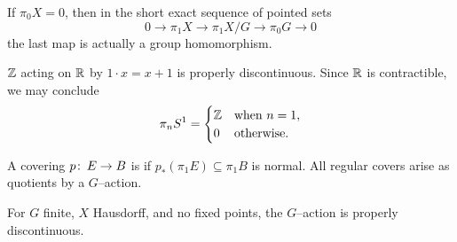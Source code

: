 \begin{remark}
If $\pi_0 X = 0$, then in the short exact sequence of pointed sets \[0 \to \pi_1 X \to \pi_1 X/G \to \pi_0 G \to 0\] the last map is actually a group homomorphism.
\end{remark}

\begin{example}
$\mathbb Z$ acting on $\mathbb R$ by $1 \cdot x = x+1$ is properly discontinuous.
Since $\mathbb R$ is contractible, we may conclude \[\pi_n S^1 = \begin{cases} \mathbb Z & \text{when $n = 1$}, \\ 0 & \text{otherwise}. \end{cases}\]
\end{example}

\begin{remark}
A covering $p\colon\thinspace E \to B$ is  if $p_*(\pi_1 E) \subseteq \pi_1 B$ is normal.
All regular covers arise as quotients by a $G$--action.
\end{remark}

\begin{remark}
For $G$ finite, $X$ Hausdorff, and no fixed points, the $G$--action is properly discontinuous.
\end{remark}





